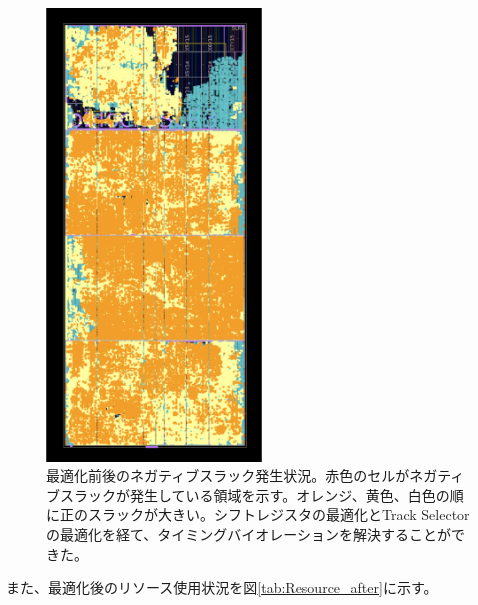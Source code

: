 \begin{figure}
\begin{minipage}[b]{.33\linewidth}
\end{minipage}%
\begin{minipage}[b]{.33\linewidth}
\centering
\includegraphics[height=12cm]{fig/SL/Metrics_trackselector.png}
\end{minipage}%
\caption[]{最適化前後のネガティブスラック発生状況。赤色のセルがネガティブスラックが発生している領域を示す。オレンジ、黄色、白色の順に正のスラックが大きい。シフトレジスタの最適化とTrack Selectorの最適化を経て、タイミングバイオレーションを解決することができた。}
\label{SL_Metrics}
\end{figure}

また、最適化後のリソース使用状況を図\ref{tab:Resource_after}に示す。

